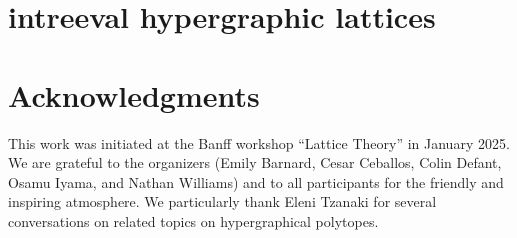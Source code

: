 \documentclass{amsart}
\theoremstyle{definition}
\begin{document}

\section{intreeval hypergraphic lattices}
\label{sec:intreevalHypergraphicPosets}


\section*{Acknowledgments}

This work was initiated at the Banff workshop ``Lattice Theory'' in January 2025.
We are grateful to the organizers (Emily Barnard, Cesar Ceballos, Colin Defant, Osamu Iyama, and Nathan Williams) and to all participants for the friendly and inspiring atmosphere.
We particularly thank Eleni Tzanaki for several conversations on related topics on hypergraphical polytopes.




\label{sec:biblio}

\end{document}
